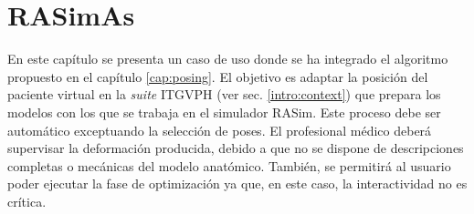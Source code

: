 \chapter{RASimAs} 
\label{cap:rasim}


En este capítulo se presenta un caso de uso donde se ha integrado el algoritmo propuesto en el capítulo \ref{cap:posing}. El objetivo es adaptar la posición del paciente virtual en la \emph{suite} \ac{ITGVPH} (ver sec. \ref{intro:context}) que prepara los modelos con los que se trabaja en el simulador \ac{RASim}. Este proceso debe ser automático exceptuando la selección de poses. El profesional médico deberá supervisar la deformación producida, debido a que no se dispone de descripciones completas o mecánicas del modelo anatómico. También, se permitirá al usuario poder ejecutar la fase de optimización ya que, en este caso, la interactividad no es crítica. %






